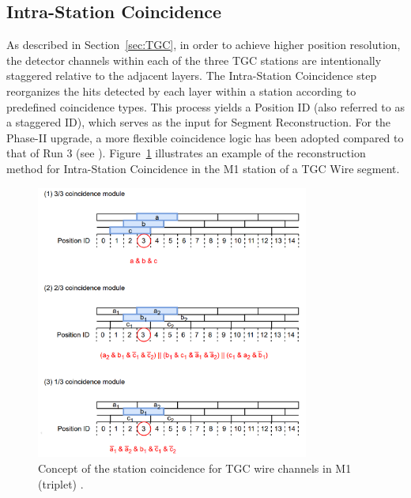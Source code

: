 \subsection{Intra-Station Coincidence} \label{subsec:IntraCoin}
As described in Section~\ref{sec:TGC}, in order to achieve higher position resolution, the detector channels within each of the three TGC stations are intentionally staggered relative to the adjacent layers. The Intra-Station Coincidence step reorganizes the hits detected by each layer within a station according to predefined coincidence types. This process yields a Position ID (also referred to as a staggered ID), which serves as the input for Segment Reconstruction. For the Phase-II upgrade, a more flexible coincidence logic has been adopted compared to that of Run 3 (see \cite{yamashita}). Figure~\ref{fig:IntraCoin} illustrates an example of the reconstruction method for Intra-Station Coincidence in the M1 station of a TGC Wire segment.

\begin{figure}[htbp]
  \centering
  \includegraphics[width=0.8\textwidth]{figs/chapter5/Intra_station_coincidence.png}
  \caption{Concept of the station coincidence for TGC wire channels in M1 (triplet) \cite{EndcapSLPDR}.}
  \label{fig:IntraCoin}
\end{figure}

